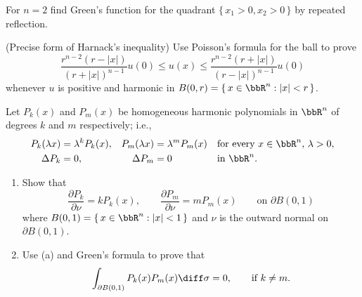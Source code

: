 \begin{problem}
  For \(n=2\) find Green's function for the quadrant
  \(\{\,x_1>0,x_2>0\,\}\) by repeated reflection.
\end{problem}
\begin{solution}
\end{solution}
\newpage

\begin{problem}
  (Precise form of Harnack's inequality) Use Poisson's formula for the ball
  to prove
  \[
    \frac{r^{n-2}(r-|x|)}{(r+|x|)^{n-1}}u(0)%
    \leq u(x)%
    \leq \frac{r^{n-2}(r+|x|)}{(r-|x|)^{n-1}}u(0)
  \]
  whenever \(u\) is positive and harmonic in
  \(B(0,r)=\{\,x\in\bbR^n:|x|<r\,\}\).
\end{problem}
\begin{solution}
\end{solution}
\newpage

\begin{problem}
  Let \(P_k(x)\) and \(P_m(x)\) be homogeneous harmonic polynomials in
  \(\bbR^n\) of degrees \(k\) and \(m\) respectively; i.e.,
  \begin{align*}
    P_k(\lambda x)&=\lambda^k P_k(x),&P_m(\lambda x)&=\lambda^m P_m(x)
    &&\text{for every \(x\in\bbR^n\), \(\lambda>0\),}\\
    \Delta P_k&=0,&\Delta P_m&=0&&\text{in \(\bbR^n\).}
  \end{align*}
  \begin{enumerate}[label=(\alph*),noitemsep]
  \item Show that
    \[
      \frac{\partial P_k}{\partial \nu}=kP_k(x),\qquad
      \frac{\partial P_m}{\partial\nu}=mP_m(x)\qquad\text{on \(\partial B(0,1)\)}
    \]
    where \(B(0,1)=\{\,x\in\bbR^n:|x|<1\,\}\) and \(\nu\) is the outward
    normal on \(\partial B(0,1)\).
  \item Use (a) and Green's formula to prove that
    \[
      \int_{\partial B(0,1)}P_k(x)P_m(x)\diff\sigma=0,\qquad\text{if
        \(k\neq m\).}
    \]
  \end{enumerate}
\end{problem}
\begin{solution}
\end{solution}

